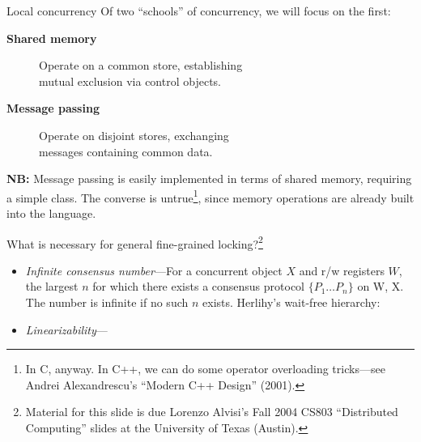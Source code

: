 \documentclass[xcolor={dvipsnames,table}]{beamer}
\begin{document}
\begin{frame}{Local concurrency}
Of two ``schools'' of concurrency, we will focus on the first:
\vfill
\begin{description}
\item[\textbf{Shared memory}]\hfill{Operate on a common store, establishing\\ \hfill mutual exclusion via control objects.}
\item[\textbf{Message passing}]\hfill{Operate on disjoint stores, exchanging\\ \hfill messages containing common data.}
\end{description}
\vfill
\textbf{NB:} Message passing is easily implemented
in terms of shared memory, requiring a simple class. The converse is untrue\footnote{In C, anyway.
In C++, we can do some operator overloading tricks---see Andrei Alexandrescu's ``Modern C++ Design'' (2001).}, since
memory operations are already built into the language.
\end{frame}

\begin{frame}
What is necessary for general fine-grained locking?\footnote{Material for this slide is due Lorenzo Alvisi's
Fall 2004 CS803 ``Distributed Computing'' slides at the University of Texas (Austin).}
\begin{itemize}
\item \textit{Infinite consensus number}---For a concurrent object $X$ and
r/w registers $W$, the largest $n$ for which there exists
a consensus protocol $\{P_1\ldots P_n\}$ on {W, X}. The number is infinite if no
such $n$ exists. Herlihy's wait-free hierarchy:
\begin{center}
\end{center}
\item \textit{Linearizability}---
\end{itemize}
\end{frame}
\end{document}
